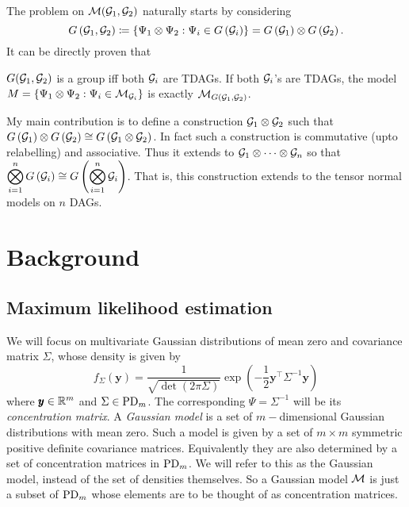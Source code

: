 The problem on ${\mathcal{M}}({\mathcal{G}}_1,{\mathcal{G}}_2)$ naturally starts by considering $$G\left({\mathcal{G}}_1,{\mathcal{G}}_2\right) \coloneqq \left\{\Psi_1\otimes\Psi_2: \Psi_i\in G\left({\mathcal{G}}_i\right)\right\} = G\left({\mathcal{G}}_1\right)\otimes G\left({\mathcal{G}}_2\right).$$ It can be directly proven that 
\begin{prop}
$G({\mathcal{G}}_1,{\mathcal{G}}_2)$ is a group iff both ${\mathcal{G}}_i$ are TDAGs. If both ${\mathcal{G}}_i$'s are TDAGs, the model $M = \left\{\Psi_1\otimes\Psi_2: \Psi_i\in {\mathcal{M}}_{{\mathcal{G}}_i}\right\}$  is exactly ${\mathcal{M}}_{G\left({\mathcal{G}}_1,{\mathcal{G}}_2\right)}$.
\end{prop}

My main contribution is to define a construction ${\mathcal{G}}_1\otimes {\mathcal{G}}_2$ such that $G\left({\mathcal{G}}_1\right)\otimes G\left({\mathcal{G}}_2\right) \cong G\left({\mathcal{G}}_1\otimes {\mathcal{G}}_2\right)$. In fact such a construction is commutative (upto relabelling) and associative. Thus it extends to ${\mathcal{G}}_1\otimes\cdots\otimes {\mathcal{G}}_n$ so that $\displaystyle \bigotimes_{i=1}^nG\left({\mathcal{G}}_i\right) \cong  G\left(\bigotimes_{i=1}^n{\mathcal{G}}_i\right)$. That is, this construction extends to the tensor normal models on $n$ DAGs.


\section{Background}

\subsection{Maximum likelihood estimation}

We will focus on multivariate Gaussian distributions of mean zero and covariance matrix $\Sigma$, whose density is given by $$f_{\Sigma}(\pmb y) = \frac{1}{\sqrt{\det(2\pi \Sigma)}} \exp\left(-\frac{1}{2}\pmb y^\intercal\Sigma^{-1}\pmb y\right)$$
where $\pmb y\in \mathbb{R}^m$ and $\Sigma \in \operatorname{PD}_m$.
The corresponding $\Psi = \Sigma^{-1}$ will be its \emph{concentration matrix}. A \emph{Gaussian model} is a set of $m-$dimensional Gaussian distributions with mean zero. Such a model is given by a set of $m\times m$ symmetric positive definite covariance matrices. Equivalently they are also determined by a set of concentration matrices in $\operatorname{PD}_m$. We will refer to this as the Gaussian model, instead of the set of densities themselves. So a Gaussian model ${\mathcal{M}}$ is just a subset of $\operatorname{PD}_m$ whose elements are to be thought of as concentration matrices.

